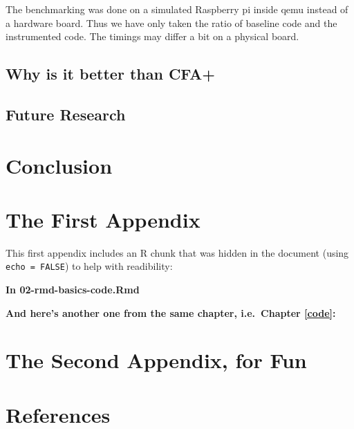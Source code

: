 \documentclass[a4paper, nobind]{templates/ociamthesis}
\begin{document}
The benchmarking was done on a simulated Raspberry pi inside qemu instead of a
hardware board. Thus we have only taken the ratio of baseline code and the
instrumented code. The timings may differ a bit on a physical board.

\section{Why is it better than CFA+}\label{why-is-it-better-than-cfa}

\section{Future Research}\label{future-research}

\chapter*{Conclusion}\label{conclusion}

\startappendices

\chapter{The First Appendix}\label{the-first-appendix}

This first appendix includes an R chunk that was hidden in the document (using \texttt{echo\ =\ FALSE}) to help with readibility:

\textbf{In 02-rmd-basics-code.Rmd}

\textbf{And here's another one from the same chapter, i.e.~Chapter \ref{code}:}

\chapter{The Second Appendix, for Fun}\label{the-second-appendix-for-fun}

\chapter*{References}\label{references}

\end{document}
